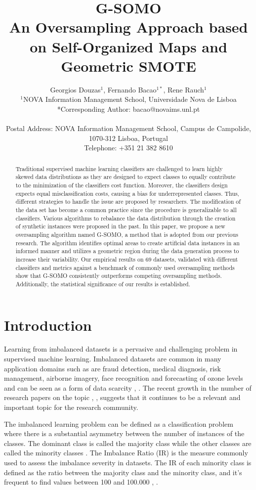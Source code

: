 \documentclass[parskip=full]{scrartcl}
\title{G-SOMO \\ \LARGE{An Oversampling Approach based on Self-Organized Maps and Geometric SMOTE}}
\author{
	Georgios Douzas\(^{1}\), Fernando Bacao\(^{1*}\), Rene Rauch\(^{1}\)
	\\
	\small{\(^{1}\)NOVA Information Management School, Universidade Nova de Lisboa}
	\\
	\small{*Corresponding Author: bacao@novaims.unl.pt}
	\\
	\\
	\small{Postal Address: NOVA Information Management School, Campus de Campolide, 1070-312 Lisboa, Portugal}
	\\
	\small{Telephone: +351 21 382 8610}
}
\date{}
\begin{document}
\maketitle

\begin{abstract}
	Traditional supervised machine learning classifiers are challenged to learn
	highly skewed data distributions as they are designed to expect classes to
	equally contribute to the minimization of the classifiers cost function.
	Moreover, the classifiers design expects equal misclassification costs, causing a bias for underrepresented classes. Thus, different strategies to handle the issue are proposed by researchers. The modification of the data set has become a common practice since the procedure is generalizable to all classifiers. Various algorithms to rebalance the data distribution through the creation of synthetic instances were proposed in the past. In this paper, we propose a new oversampling algorithm named G-SOMO, a method that is adopted from our previous research. The algorithm identifies optimal areas to create artificial data instances in an informed manner and utilizes a geometric region during the data generation process to increase their variability. Our empirical results on 69 datasets, validated with different classifiers and metrics against a benchmark of commonly used oversampling methods show that G-SOMO consistently outperforms competing oversampling methods. Additionally, the statistical significance of our results is established.
\end{abstract}

\section{Introduction}

Learning from imbalanced datasets is a pervasive and challenging problem in supervised machine learning. Imbalanced datasets are common in many application domains such as are fraud detection, medical diagnosis, risk management, airborne imagery, face recognition and forecasting of ozone levels and can be seen as a form of data scarcity \cite{Vong2014}, \cite{He2009}. The recent growth in the number of research papers on the topic \cite{Haixiang2017}, \cite{Fernandez2018}, suggests that it continues to be a relevant and important topic for the research community.

The imbalanced learning problem can be defined as a classification problem where there is a substantial asymmetry between the number of instances of the classes. The dominant class is called the majority class while the other classes are called the minority classes \cite{Chawla2003}. The Imbalance Ratio (IR) is the measure commonly used to assess the imbalance severity in datasets. The IR of each minority class is defined as the ratio between the majority class and the minority class, and it’s frequent to find values between 100 and 100.000 \cite{Chawla2002}, \cite{Barua2014}.
\end{document}

